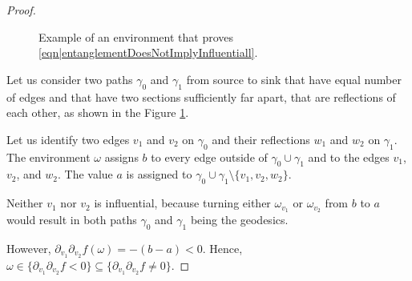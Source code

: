 \documentclass[reqno]{amsart}
\begin{document}
\begin{proof}
 \begin{figure}[t]
 \centering
{}
\caption{Example of an environment that proves \eqref{eqn|entanglementDoesNotImplyInfluentiall}.}
\label{fig|entanglementDoesNotImplyInfluentiall}
\end{figure}

Let us consider two paths $\gamma_0$ and $\gamma_1$ from source to sink that have equal number of edges and that have two sections sufficiently far apart, that are reflections of each other, as shown in the Figure \ref{fig|entanglementDoesNotImplyInfluentiall}. 

Let us identify two edges $v_1$ and $v_2$ on $\gamma_0$ and their reflections $w_1$ and $w_2$ on $\gamma_1$. The environment $\omega$ assigns $b$ to every edge outside of $\gamma_0\cup \gamma_1$ and to the edges $v_1$, $v_2$, and $w_2$. The value $a$ is assigned to $\gamma_0\cup\gamma_1\setminus\{v_1,v_2,w_2\}$. 

Neither $v_1$ nor $v_2$ is influential, because turning either $\omega_{v_1}$ or $\omega_{v_2}$ from $b$ to $a$ would result in both paths $\gamma_0$ and $\gamma_1$ being the geodesics.   

However, $\partial_{v_1}\partial_{v_2}f(\omega)=-(b-a)<0$. Hence, 
$\omega\in \{\partial_{v_1}\partial_{v_2}f <0\}\subseteq \{\partial_{v_1}\partial_{v_2}f\neq 0\}$. 
\end{proof}
\end{document}
